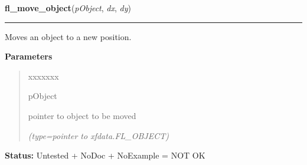 \hspace{.8\funcindent}\begin{boxedminipage}{\funcwidth}

    \raggedright \textbf{fl\_move\_object}(\textit{pObject}, \textit{dx}, \textit{dy})

    \vspace{-1.5ex}

    \rule{\textwidth}{0.5\fboxrule}
\setlength{\parskip}{2ex}
    Moves an object to a new position.

\setlength{\parskip}{1ex}
      \textbf{Parameters}
      \vspace{-1ex}

      \begin{quote}
        \begin{Ventry}{xxxxxxx}

          \item[pObject]

          pointer to object to be moved

            {\it (type=pointer to xfdata.FL\_OBJECT)}

        \end{Ventry}

      \end{quote}

\textbf{Status:} Untested + NoDoc + NoExample = NOT OK



    \end{boxedminipage}

    \label{xformslib:library:fl_fit_object_label}

    \vspace{0.5ex}

